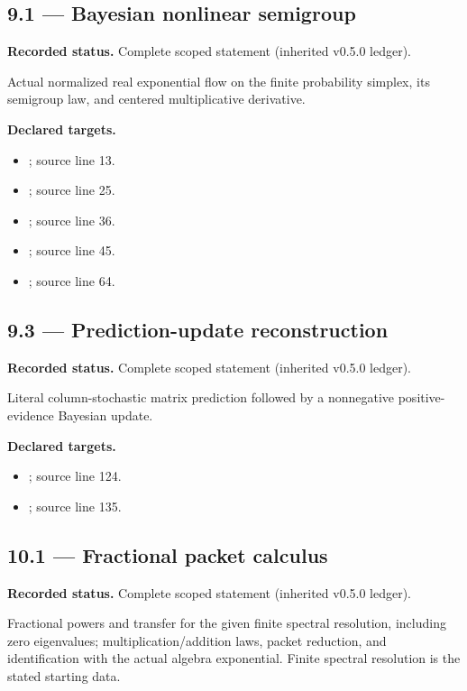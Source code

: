 \subsection{9.1 — Bayesian nonlinear semigroup}
\label{result:9.1}
\textbf{Recorded status.} Complete scoped statement (inherited v0.5.0 ledger).\par
Actual normalized real exponential flow on the finite probability simplex, its semigroup law, and centered multiplicative derivative.

\textbf{Declared targets.}\begin{itemize}
\item {}; source line 13.
\item {}; source line 25.
\item {}; source line 36.
\item {}; source line 45.
\item {}; source line 64.
\end{itemize}
\subsection{9.3 — Prediction-update reconstruction}
\label{result:9.3}
\textbf{Recorded status.} Complete scoped statement (inherited v0.5.0 ledger).\par
Literal column-stochastic matrix prediction followed by a nonnegative positive-evidence Bayesian update.

\textbf{Declared targets.}\begin{itemize}
\item {}; source line 124.
\item {}; source line 135.
\end{itemize}
\subsection{10.1 — Fractional packet calculus}
\label{result:10.1}
\textbf{Recorded status.} Complete scoped statement (inherited v0.5.0 ledger).\par
Fractional powers and transfer for the given finite spectral resolution, including zero eigenvalues; multiplication/addition laws, packet reduction, and identification with the actual algebra exponential. Finite spectral resolution is the stated starting data.

